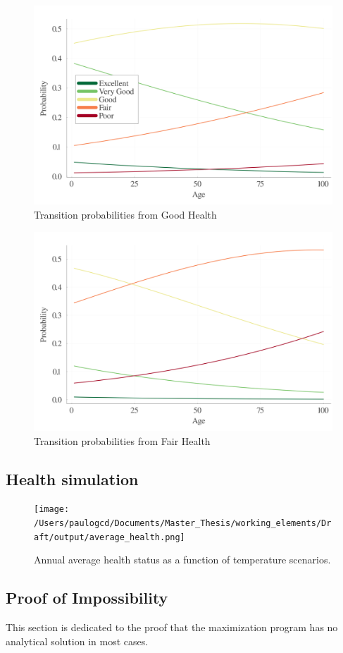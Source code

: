 \documentclass{article}
\begin{document}
\begin{figure}[H]\label{fig:health_transition_3}
    \begin{center}
        \includegraphics[width=0.4\linewidth]{output/health_transition_3.png}
        \caption{Transition probabilities from Good Health}  
    \end{center}  
\end{figure}

\begin{figure}[H]\label{fig:health_transition_4}
    \begin{center}
        \includegraphics[width=0.4\linewidth]{output/health_transition_4.png}
        \caption{Transition probabilities from Fair Health}    
    \end{center}
\end{figure}

\subsection{Health simulation}

\begin{figure}[H]
    \texttt{[image: /Users/paulogcd/Documents/Master\_Thesis/working\_elements/Draft/output/average\_health.png]}
    \caption{Annual average health status as a function of temperature scenarios.}
\end{figure}

\subsection{Proof of Impossibility}

This section is dedicated to the proof that the maximization program
has no analytical solution in most cases.
\end{document}
